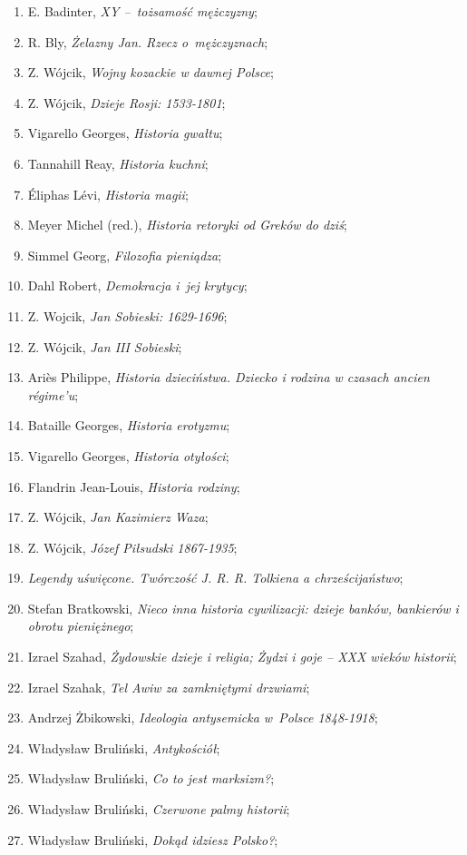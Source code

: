 \documentclass[a4paper,11pt]{article}
\begin{document}
\begin{enumerate}
\item E. Badinter, \emph{XY --~tożsamość mężczyzny};
\item R. Bly, \emph{Żelazny Jan. Rzecz o~mężczyznach};
\item Z. Wójcik, \emph{Wojny kozackie w dawnej Polsce};
\item Z. Wójcik, \emph{Dzieje Rosji: 1533-1801};
\item Vigarello Georges, \emph{Historia gwałtu};
\item Tannahill Reay, \emph{Historia kuchni};
\item Éliphas Lévi, \emph{Historia magii};
\item Meyer Michel (red.), \emph{Historia retoryki od Greków do dziś};
\item Simmel Georg, \emph{Filozofia pieniądza};
\item Dahl Robert, \emph{Demokracja i~jej krytycy};
\item Z. Wojcik, \emph{Jan Sobieski: 1629-1696};
\item Z. Wójcik, \emph{Jan III Sobieski};
\item Ariès Philippe, \emph{Historia dzieciństwa. Dziecko i rodzina w
    czasach ancien régime’u};
\item Bataille Georges, \emph{Historia erotyzmu};
\item Vigarello Georges, \emph{Historia otyłości};
\item Flandrin Jean-Louis, \emph{Historia rodziny};
\item Z. Wójcik, \emph{Jan Kazimierz Waza};
\item Z. Wójcik, \emph{Józef Piłsudski 1867-1935};
\item \emph{Legendy uświęcone. Twórczość J. R. R. Tolkiena a
    chrześcijaństwo};
\item Stefan Bratkowski, \emph{Nieco inna historia cywilizacji: dzieje
    banków, bankierów i obrotu pieniężnego};
\item Izrael Szahad, \emph{Żydowskie dzieje i religia; Żydzi i goje –
    XXX wieków historii};
\item Izrael Szahak, \emph{Tel Awiw za zamkniętymi drzwiami};
\item Andrzej Żbikowski, \emph{Ideologia antysemicka w~Polsce
    1848-1918};
\item Władysław Bruliński, \emph{Antykościół};
\item Władysław Bruliński, \emph{Co to jest marksizm?};
\item Władysław Bruliński, \emph{Czerwone palmy historii};
\item Władysław Bruliński, \emph{Dokąd idziesz Polsko?};

\end{enumerate}
\end{document}
